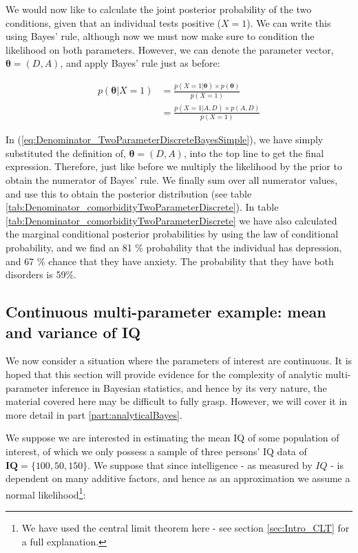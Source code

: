 \documentclass[11pt,fullpage]{book}
\begin{document}
We would now like to calculate the joint posterior probability of the two conditions, given that an individual tests positive ($X=1$). We can write this using Bayes' rule, although now we must now make sure to condition the likelihood on both parameters. However, we can denote the parameter vector, $\boldsymbol{\theta}=(D,A)$, and apply Bayes' rule just as before:

\begin{equation}\label{eq:Denominator_TwoParameterDiscreteBayesSimple}
\begin{align}
p(\boldsymbol{\theta}|X=1) &= \frac{p(X=1|\boldsymbol{\theta})\times p(\boldsymbol{\theta})}{p(X=1)}\\
& = \frac{p(X=1|A,D)\times p(A,D)}{p(X=1)}
\end{align}
\end{equation}

In (\ref{eq:Denominator_TwoParameterDiscreteBayesSimple}), we have simply substituted the definition of, $\boldsymbol{\theta}=(D,A)$, into the top line to get the final expression. Therefore, just like before we multiply the likelihood by the prior to obtain the numerator of Bayes' rule. We finally sum over all numerator values, and use this to obtain the posterior distribution (see table \ref{tab:Denominator_comorbidityTwoParameterDiscrete}). In table \ref{tab:Denominator_comorbidityTwoParameterDiscrete} we have also calculated the marginal conditional posterior probabilities by using the law of conditional probability, and we find an 81 \% probability that the individual has depression, and 67 \% chance that they have anxiety. The probability that they have both disorders is 59\%.

\subsection{Continuous multi-parameter example: mean and variance of IQ}\label{sec:Denominator_continuousTwoParameterIQ}
We now consider a situation where the parameters of interest are continuous. It is hoped that this section will provide evidence for the complexity of analytic multi-parameter inference in Bayesian statistics, and hence by its very nature, the material covered here may be difficult to fully grasp. However, we will cover it in more detail in part \ref{part:analyticalBayes}.

We suppose we are interested in estimating the mean IQ of some population of interest, of which we only possess a sample of three persons' IQ data of $\boldsymbol{IQ}=\{100,50,150\}$. We suppose that since intelligence - as measured by $IQ$ - is dependent on many additive factors, and hence as an approximation we assume a normal likelihood\footnote{We have used the central limit theorem here - see section \ref{sec:Intro_CLT} for a full explanation.}:
\end{document}
